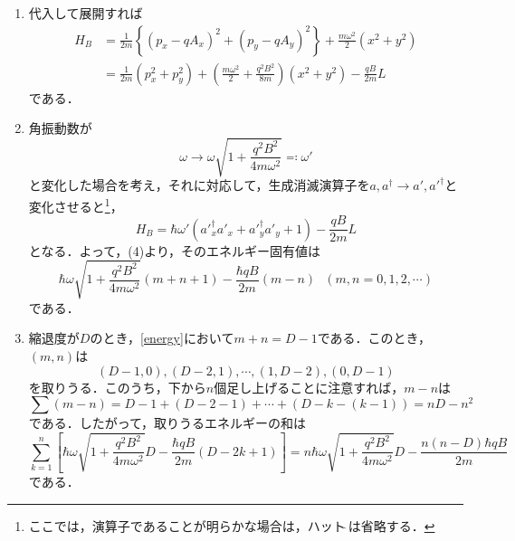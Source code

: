 \documentclass[a4paper,pdflatex,ja=standard]{bxjsarticle}
\begin{document}
\begin{enumerate}
  \item 
  代入して展開すれば
  \begin{align}
    H_{B}
    &=
    \frac{1}{2m}
    \left\{ 
      \left( p_{x}-qA_{x} \right)^2
      +
      \left( p_{y}-qA_{y} \right)^2
    \right\}
    +
    \frac{m\omega^2}{2}(x^2+y^2)
    \nonumber
    \\
    &=
    \frac{1}{2m}(p_{x}^2+p_{y}^2)
    +
    \left( \frac{m\omega^2}{2}+\frac{q^2B^2}{8m} \right)(x^2+y^2)
    -
    \frac{qB}{2m}L
  \end{align}
  である．

  \item 
  角振動数が
  \begin{equation}
    \omega
    \rightarrow
    \omega\sqrt{1+\frac{q^2B^2}{4m\omega^2}}\eqqcolon\omega'
  \end{equation}
  と変化した場合を考え，それに対応して，生成消滅演算子を$a,a^{\dagger}\rightarrow a',{a'}^{\dagger}$と変化させると\footnote{ここでは，演算子であることが明らかな場合は，ハット$\hat{\ }$は省略する．}，
  \begin{equation}
    H_{B}
    =
    \hbar\omega'
    \left(  
      {a'}_{x}^{\dagger}{a'}_{x}
      +
      {a'}_{y}^{\dagger}{a'}_{y}
      +
      1
    \right)
    -
    \frac{qB}{2m}L
  \end{equation}
  となる．よって，(4)より，そのエネルギー固有値は
  \begin{equation}
    \hbar\omega\sqrt{1+\frac{q^2B^2}{4m\omega^2}}(m+n+1)
    -
    \frac{\hbar qB}{2m}(m-n)
    \ \ \ 
    (m,n=0,1,2,\cdots)
    \label{energy}
  \end{equation}
  である．

  \item 
  縮退度が$D$のとき，\eqref{energy}において$m+n=D-1$である．このとき，$(m,n)$は
  \begin{equation}
    (D-1,0),(D-2,1),\cdots,(1,D-2),(0,D-1)
  \end{equation}
  を取りうる．このうち，下から$n$個足し上げることに注意すれば，$m-n$は
  \begin{equation}
    \sum
    (m-n)
    =
    D-1+(D-2-1)+\cdots+(D-k-(k-1))
    =
   nD-n^2 
  \end{equation}
  である．したがって，取りうるエネルギーの和は
  \begin{equation}
    \sum_{k=1}^{n}
    \left[  
      \hbar\omega\sqrt{1+\frac{q^2B^2}{4m\omega^2}}D
      -
      \frac{\hbar qB}{2m}(D-2k+1)
    \right]
    =
    n\hbar\omega\sqrt{1+\frac{q^2B^2}{4m\omega^2}}D
    -
    \frac{n(n-D)\hbar qB}{2m}
  \end{equation}
  である．


\end{enumerate}
\end{document}
